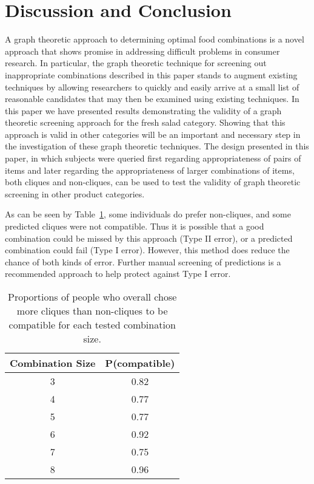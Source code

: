 \section{Discussion and Conclusion}
A graph theoretic approach to determining optimal food combinations is a novel approach that shows promise in addressing difficult problems in consumer research.  In particular, the graph theoretic technique for screening out inappropriate combinations described in this paper stands to augment existing techniques by allowing researchers to quickly and easily arrive at a small list of reasonable candidates that may then be examined using existing techniques.  In this paper we have presented results demonstrating the validity of a graph theoretic screening approach for the fresh salad category.  Showing that this approach is valid in other categories will be an important and necessary step in the investigation of these graph theoretic techniques.  The design presented in this paper, in which subjects were queried first regarding appropriateness of pairs of items and later regarding the appropriateness of larger combinations of items, both cliques and non-cliques, can be used to test the validity of graph theoretic screening in other product categories.  

As can be seen by Table~\ref{tab:propsalad}, some individuals do prefer non-cliques, and some predicted cliques were not compatible.   Thus it is possible that a good combination could be missed by this approach (Type II error), or a predicted combination could fail (Type I error).  However, this method does reduce the chance of both kinds of error.  Further manual screening of predictions is a recommended approach to help protect against Type I error.    

\begin{table}[h!b!p!]
\caption[Proportions of people whom preferred cliques over non-cliques to be compatible.]{Proportions of people who overall chose more cliques than non-cliques to be compatible for each tested combination size.}
\centering
\begin{tabular}{cc}
\toprule
{\bf Combination Size} & {\bf P(compatible)} \\
\midrule
3 & 0.82 \\
4 & 0.77  \\
5 & 0.77 \\
6 & 0.92 \\
7 & 0.75 \\
8 & 0.96  \\
\bottomrule
\end{tabular}
\label{tab:propsalad}
\end{table}

